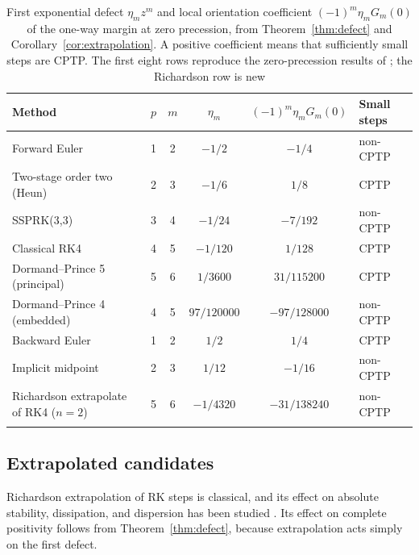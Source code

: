 \documentclass[pdflatex,sn-mathphys-num]{sn-jnl}
\theoremstyle{thmstyleone}
\theoremstyle{thmstylethree}
\theoremstyle{thmstyletwo}
\begin{document}
\begin{table}[tbp]
\caption{First exponential defect $\eta_mz^m$ and local orientation coefficient $(-1)^m\eta_mG_m(0)$ of the one-way margin at zero precession, from Theorem~\ref{thm:defect} and Corollary~\ref{cor:extrapolation}. A positive coefficient means that sufficiently small steps are CPTP. The first eight rows reproduce the zero-precession results of \cite{PierpointBernardLiu2026Note}; the Richardson row is new}\label{tab:methods}
\footnotesize
\begin{tabular*}{\textwidth}{@{\extracolsep\fill}lccccl}
\toprule
Method & $p$ & $m$ & $\eta_m$ & $(-1)^m\eta_mG_m(0)$ & Small steps \\
\midrule
Forward Euler & 1 & 2 & $-1/2$ & $-1/4$ & non-CPTP \\
Two-stage order two (Heun) & 2 & 3 & $-1/6$ & $1/8$ & CPTP \\
SSPRK(3,3) & 3 & 4 & $-1/24$ & $-7/192$ & non-CPTP \\
Classical RK4 & 4 & 5 & $-1/120$ & $1/128$ & CPTP \\
Dormand--Prince 5 (principal) & 5 & 6 & $1/3600$ & $31/115200$ & CPTP \\
Dormand--Prince 4 (embedded) & 4 & 5 & $97/120000$ & $-97/128000$ & non-CPTP \\
Backward Euler & 1 & 2 & $1/2$ & $1/4$ & CPTP \\
Implicit midpoint & 2 & 3 & $1/12$ & $-1/16$ & non-CPTP \\
Richardson extrapolate of RK4 ($n=2$) & 5 & 6 & $-1/4320$ & $-31/138240$ & non-CPTP \\
\botrule
\end{tabular*}
\end{table}

\subsection{Extrapolated candidates}\label{sec:extrapolation}

Richardson extrapolation of RK steps is classical, and its effect on absolute stability, dissipation, and dispersion has been studied \cite{Szyszkowicz1985Richardson,HavasiKazemi2018Richardson}. Its effect on complete positivity follows from Theorem~\ref{thm:defect}, because extrapolation acts simply on the first defect.
\end{document}
